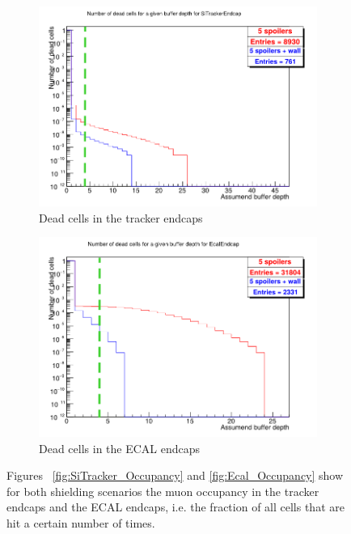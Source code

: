 \begin{figure}
\begin{subfigure}[b]{0.49\textwidth}
    \centering
        \includegraphics[height=0.265\textheight]{figures/SiTrackerEndcap_DeadCells.png}
        \caption{Dead cells in the tracker endcaps}
	\label{fig:SiTracker_DeadCells}
    \end{subfigure}
    \begin{subfigure}[b]{0.49\textwidth}
    \centering
        \includegraphics[height=0.265\textheight]{figures/EcalEndcap_DeadCells.png}
        \caption{Dead cells in the ECAL endcaps}
        \label{fig:Ecal_DeadCells}
    \end{subfigure}
    \caption[Muon occupancy in the tracker endcaps and ECAL endcaps]{
    Figures ~\ref{fig:SiTracker_Occupancy} and \ref{fig:Ecal_Occupancy} show for both shielding scenarios the muon occupancy in the tracker endcaps and the ECAL endcaps, i.e. the fraction of all cells that are hit a certain number of times.
}
\end{figure}
